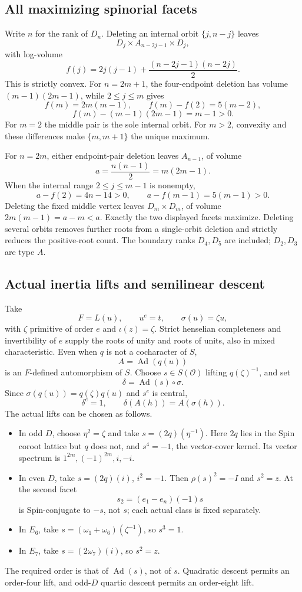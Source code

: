 \documentclass[11pt,a4paper]{article}
\theoremstyle{definition}
\theoremstyle{remark}
\begin{document}
\subsection{All maximizing spinorial facets}
Write \(n\) for the rank of \(D_n\). Deleting an internal orbit
\(\{j,n-j\}\) leaves
\[
D_j\times A_{n-2j-1}\times D_j,
\]
with log-volume
\[
f(j)=2j(j-1)+\frac{(n-2j-1)(n-2j)}2.
\]
This is strictly convex. For \(n=2m+1\), the four-endpoint deletion
has volume \((m-1)(2m-1)\), while \(2\le j\le m\) gives
\[
f(m)=2m(m-1),\qquad f(m)-f(2)=5(m-2),
\]
\[
f(m)-(m-1)(2m-1)=m-1>0.
\]
For \(m=2\) the middle pair is the sole internal orbit. For \(m>2\),
convexity and these differences make \(\{m,m+1\}\) the unique
maximum.

For \(n=2m\), either endpoint-pair deletion leaves \(A_{n-1}\), of
volume
\[
a=\frac{n(n-1)}2=m(2m-1).
\]
When the internal range \(2\le j\le m-1\) is nonempty,
\[
a-f(2)=4n-14>0,\qquad a-f(m-1)=5(m-1)>0.
\]
Deleting the fixed middle vertex leaves \(D_m\times D_m\), of
volume \(2m(m-1)=a-m<a\). Exactly the two displayed facets maximize.
Deleting several orbits removes further roots from a single-orbit
deletion and strictly reduces the positive-root count.
The boundary ranks \(D_4,D_5\) are included; \(D_2,D_3\) are type \(A\).

\subsection{Actual inertia lifts and semilinear descent}
Take
\[
F=L(u),\qquad u^e=t,\qquad \sigma(u)=\zeta u,
\]
with \(\zeta\) primitive of order \(e\) and \(\iota(z)=\zeta\).
Strict henselian completeness and invertibility of \(e\) supply the
roots of unity and roots of units, also in mixed characteristic.
Even when \(q\) is not a cocharacter of \(S\),
\[
A=\operatorname{Ad}(q(u))
\]
is an \(F\)-defined automorphism of \(S\). Choose
\(s\in S(\mathcal O)\) lifting \(q(\zeta)^{-1}\), and set
\[
\delta=\operatorname{Ad}(s)\circ\sigma.
\]
Since \(\sigma(q(u))=q(\zeta)q(u)\) and \(s^e\) is central,
\[
\delta^e=1,\qquad \delta(A(h))=A(\sigma(h)).
\]
The actual lifts can be chosen as follows.
\begin{itemize}
\item In odd \(D\), choose \(\eta^2=\zeta\) and take
\(s=(2q)(\eta^{-1})\). Here \(2q\) lies in the Spin coroot lattice
but \(q\) does not, and \(s^4=-1\), the vector-cover kernel.
Its vector spectrum is \(1^{2m},(-1)^{2m},i,-i\).
\item In even \(D\), take \(s=(2q)(i)\), \(i^2=-1\).
Then \(\rho(s)^2=-I\) and \(s^2=z\).
At the second facet
\[
s_2=(e_1-e_n)(-1)s
\]
is Spin-conjugate to \(-s\), not \(s\); each actual class is fixed
separately.
\item In \(E_6\), take \(s=(\omega_1+\omega_6)(\zeta^{-1})\),
so \(s^3=1\).
\item In \(E_7\), take \(s=(2\omega_7)(i)\), so \(s^2=z\).
\end{itemize}
The required order is that of \(\operatorname{Ad}(s)\), not of \(s\).
Quadratic descent permits an order-four lift, and odd-\(D\)
quartic descent permits an order-eight lift.
\end{document}
